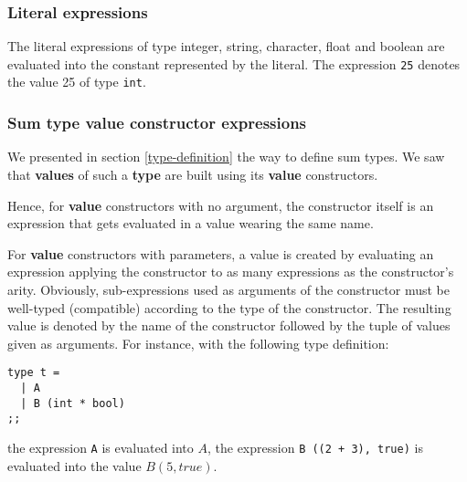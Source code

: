 \vspace{0.2cm}



\subsubsection{Literal expressions}
 

The literal
expressions  of type integer, string, character,
float and boolean are evaluated into the constant represented by the
literal. The expression {\tt 25} denotes the value 25 of type
{\tt int}.



\subsubsection{Sum type  value constructor expressions}
We presented in section \ref{type-definition} the way to define sum
types. We saw that {\bf values} of such a {\bf type} are built using
its {\bf value} constructors.

Hence, for {\bf value} constructors with no argument, the constructor itself
is an expression that gets evaluated in a value wearing the same name.

For {\bf value} constructors with parameters, a value is created by
evaluating an expression applying the constructor to as many expressions as
the constructor's arity. Obviously, sub-expressions used as arguments of
the constructor must be well-typed (compatible) according to the type of the %
constructor. The resulting value is denoted by the
name of the constructor followed by the tuple of values given as
arguments. For instance, with the following type definition:

{\scriptsize
\begin{lstlisting}
type t =
  | A
  | B (int * bool)
;;
\end{lstlisting}}

\noindent the expression {\tt A} is evaluated into $A$, the expression
{\tt B ((2 + 3), true)} is evaluated into the value $B (5, true)$.



